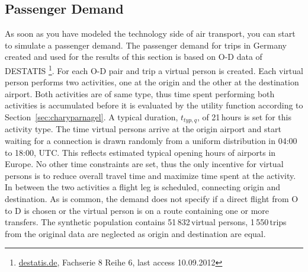 \subsection{Passenger Demand}
As soon as you have modeled the technology side of air transport, you can start to simulate a passenger demand. 
The passenger demand for trips in Germany created and used for the results of this section is based on O-D data of DESTATIS 
\footnote{\url{destatis.de}, Fachserie 8 Reihe 6, last access 10.09.2012}. 
For each O-D pair and trip a virtual person is created.
Each virtual person performs two activities, one at the origin and the other at the destination airport. 
Both activities are of same type, thus time spent performing both activities is accumulated before it is evaluated by the utility function according to Section~\ref{sec:charyparnagel}. %
A typical duration, $t_{typ,q}$, of 21\,hours is set for this activity type. 
The time virtual persons arrive at the origin airport and start waiting for a connection is drawn randomly from a uniform distribution in 04:00 to 18:00, UTC. 
This reflects estimated typical opening hours of airports in Europe.
No other time constraints are set, thus the only incentive for virtual persons is to reduce overall travel time and maximize time spent at the activity. 
In between the two activities a flight leg is scheduled, connecting origin and destination.
As is common, the demand does not specify if a direct flight from O to D is chosen or the virtual person is on a route containing one or more transfers.
The synthetic population contains 51\,832\,virtual persons, 1\,550\,trips from the original data are neglected as origin and destination are equal. 
%

